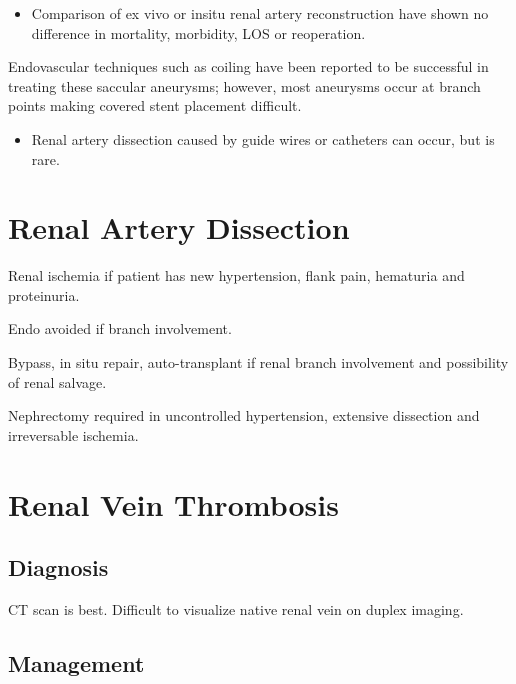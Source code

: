 \documentclass[
]{book}
\providecommand{\tightlist}{%
  \setlength{\itemsep}{0pt}\setlength{\parskip}{0pt}}
\begin{document}
\begin{itemize}
\tightlist
\item
  Comparison of ex vivo or insitu renal artery reconstruction have
  shown no difference in mortality, morbidity, LOS or reoperation.
\end{itemize}

Endovascular techniques such as coiling have been reported to be
successful in treating these saccular aneurysms; however, most aneurysms
occur at branch points making covered stent placement difficult.
\citep{colemanRenalArteryAneurysms2015}

\begin{itemize}
\tightlist
\item
  Renal artery dissection caused by guide wires or catheters can
  occur, but is rare.
\end{itemize}

\hypertarget{renal-artery-dissection}{%
\section{Renal Artery Dissection}\label{renal-artery-dissection}}

Renal ischemia if patient has new hypertension, flank pain, hematuria
and proteinuria. \citep{mullerSurgicalTreatmentRenal2003}

Endo avoided if branch involvement.

Bypass, in situ repair, auto-transplant if renal branch involvement and
possibility of renal salvage.

Nephrectomy required in uncontrolled hypertension, extensive dissection
and irreversable ischemia.

\hypertarget{renal-vein-thrombosis}{%
\section{Renal Vein Thrombosis}\label{renal-vein-thrombosis}}

\hypertarget{diagnosis}{%
\subsection{Diagnosis}\label{diagnosis}}

CT scan is best. Difficult to visualize native renal vein on duplex
imaging. \citep{asgharRenalVeinThrombosis2007, velazquez-ramirez129RenovascularDisease2019}

\hypertarget{management-26}{%
\subsection{Management}\label{management-26}}
\end{document}
